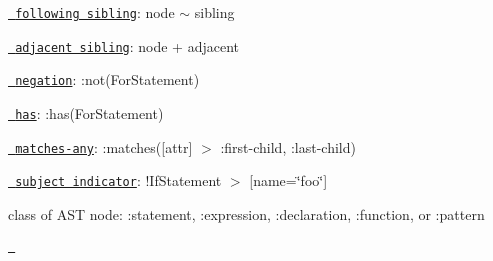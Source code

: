 \begin{DoxyItemize}
\item \href{http://dev.w3.org/csswg/selectors4/\#general-sibling-combinators}{\texttt{ following sibling}}\+: {\ttfamily node $\sim$ sibling}
\item \href{http://dev.w3.org/csswg/selectors4/\#adjacent-sibling-combinators}{\texttt{ adjacent sibling}}\+: {\ttfamily node + adjacent}
\item \href{http://dev.w3.org/csswg/selectors4/\#negation-pseudo}{\texttt{ negation}}\+: {\ttfamily \+:not(\+For\+Statement)}
\item \href{https://drafts.csswg.org/selectors-4/\#has-pseudo}{\texttt{ has}}\+: {\ttfamily \+:has(\+For\+Statement)}
\item \href{http://dev.w3.org/csswg/selectors4/\#matches}{\texttt{ matches-\/any}}\+: {\ttfamily \+:matches(\mbox{[}attr\mbox{]} $>$ \+:first-\/child, \+:last-\/child)}
\item \href{http://dev.w3.org/csswg/selectors4/\#subject}{\texttt{ subject indicator}}\+: {\ttfamily !\+If\+Statement $>$ \mbox{[}name=\char`\"{}foo\char`\"{}\mbox{]}}
\item class of A\+ST node\+: {\ttfamily \+:statement}, {\ttfamily \+:expression}, {\ttfamily \+:declaration}, {\ttfamily \+:function}, or {\ttfamily \+:pattern}
\end{DoxyItemize}

\href{https://travis-ci.org/estools/esquery}{\texttt{ }} 